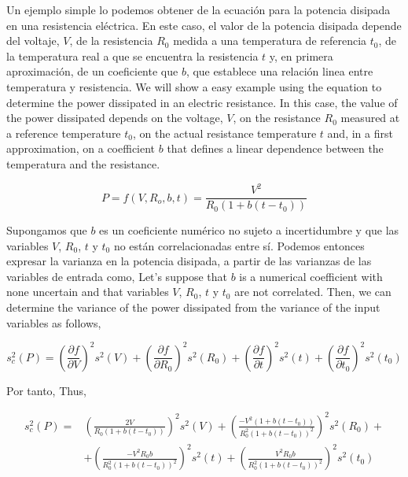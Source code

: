 \begin{paracol}{2}
Un ejemplo simple lo podemos obtener de la ecuación para la potencia disipada en una resistencia eléctrica. En este caso, el valor de la potencia disipada depende del voltaje, $V$, de la resistencia $R_0$ medida a una temperatura de referencia $t_0$, de la temperatura real a que se encuentra la resistencia $t$ y, en primera aproximación, de un coeficiente que $b$, que establece una relación linea entre temperatura y resistencia.
\switchcolumn
We will show a easy example using the equation to determine the power dissipated in an electric resistance. In this case, the value of the power dissipated depends on the voltage, $V$, on the resistance $R_0$ measured at a reference temperature $t_0$, on the actual resistance temperature $t$ and, in a first approximation, on a coefficient $b$ that defines a linear dependence between the temperatura and the resistance.    
\end{paracol}
\begin{equation*}
P = f(V,R_o,b,t) = \frac{V^2}{R_0\left(1+b(t-t_0)\right)}
\end{equation*}
\begin{paracol}{2}
Supongamos que $b$ es un coeficiente numérico no sujeto a incertidumbre y que las  variables $V$, $R_0$, $t$ y $t_0$ no están correlacionadas entre sí. Podemos entonces expresar la varianza  en la  potencia disipada, a partir de las varianzas de las variables de entrada como,
\switchcolumn
Let's suppose that $b$ is a numerical coefficient with none uncertain and that variables $V$, $R_0$, $t$ y $t_0$ are not correlated. Then, we can determine the variance of the power dissipated from the variance of the input variables as follows,
\end{paracol}
\begin{equation*}
s_c^2(P) = \left(\frac{\partial f}{\partial V}\right)^2 s^2(V)+ \left(\frac{\partial f}{\partial R_0}\right)^2 s^2(R_0)+ \left(\frac{\partial f}{\partial t}\right)^2 s^2(t)+\left(\frac{\partial f}{\partial t_0}\right)^2 s^2(t_0)    
\end{equation*}
\begin{paracol}{2}
Por tanto,
\switchcolumn
Thus,
\end{paracol}
\begin{align*}
s_c^2(P) =& \left(\frac{2V}{R_0\left(1+b(t-t_0)\right)}\right)^2 s^2(V)+ \left(\frac{-V^2\left(1+b(t-t_0)\right)}{R_0^2\left(1+b(t-t_0)\right)^2}\right)^2 s^2(R_0)+\\
&+ \left(\frac{-V^2R_0b}{R_0^2\left(1+b(t-t_0)\right)^2}\right)^2 s^2(t)+\left(\frac{V^2R_0b}{R_0^2\left(1+b(t-t_0)\right)^2}\right)^2 s^2(t_0)    
\end{align*}
